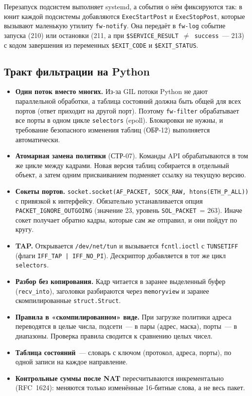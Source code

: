 \documentclass[12pt,a4paper,final]{article}
\begin{document}
Перезапуск подсистем выполняет systemd, а события о нём фиксируются
так: в юнит каждой подсистемы добавляются \texttt{ExecStartPost} и
\texttt{ExecStopPost}, которые вызывают маленькую утилиту
\texttt{fw-notify}. Она передаёт в \texttt{fw-log} событие запуска (210)
или остановки (211, а при \texttt{\$SERVICE\_RESULT}~$\neq$~\texttt{success}~— 213)
с кодом завершения из переменных \texttt{\$EXIT\_CODE} и \texttt{\$EXIT\_STATUS}.

\subsection{Тракт фильтрации на Python}\label{sec:perf}

\begin{itemize}
\item \textbf{Один поток вместо многих.} Из-за GIL потоки Python не дают
  параллельной обработки, а таблица состояний должна быть общей для всех портов
  (ответ приходит на другой порт). Поэтому \texttt{fw-filter} обрабатывает все
  порты в одном цикле \texttt{selectors} (epoll). Блокировки не нужны,
  и требование безопасного изменения таблиц (ОБР-12) выполняется
  автоматически.
\item \textbf{Атомарная замена политики} (СТР-07). Команды API обрабатываются
  в том же цикле между кадрами. Новая версия таблиц собирается в отдельный
  объект, а затем одним присваиванием подменяет ссылку на текущую версию.
\item \textbf{Сокеты портов.}
  \texttt{socket.socket(AF\_PACKET,\allowbreak{} SOCK\_RAW,\allowbreak{} htons(ETH\_P\_ALL))} с привязкой
  к интерфейсу. Обязательно устанавливается опция \texttt{PACKET\_\allowbreak IGNORE\_\allowbreak OUTGOING}
  (значение 23, уровень \texttt{SOL\_PACKET}~= 263). Иначе сокет получает
  обратно кадры, которые сам же отправил, и они пойдут по кругу.
\item \textbf{TAP.} Открывается \texttt{/dev/net/tun} и вызывается
  \texttt{fcntl.ioctl} с \texttt{TUNSETIFF} (флаги \texttt{IFF\_TAP | IFF\_NO\_PI}).
  Дескриптор добавляется в тот же цикл \texttt{selectors}.
\item \textbf{Разбор без копирования.} Кадр читается в заранее выделенный
  буфер (\texttt{recv\_into}), заголовки разбираются через \texttt{memoryview}
  и заранее скомпилированные \texttt{struct.Struct}.
\item \textbf{Правила в «скомпилированном» виде.} При загрузке политики
  адреса переводятся в целые числа, подсети~— в пары (адрес, маска), порты~—
  в диапазоны. Проверка правила сводится к сравнению целых чисел.
\item \textbf{Таблица состояний}~— словарь с ключом (протокол, адреса, порты),
  по одной записи на каждое направление.
\item \textbf{Контрольные суммы после NAT} пересчитываются инкрементально
  (RFC~1624): меняются только изменённые 16-битные слова, а не весь пакет.
\end{itemize}
\end{document}

